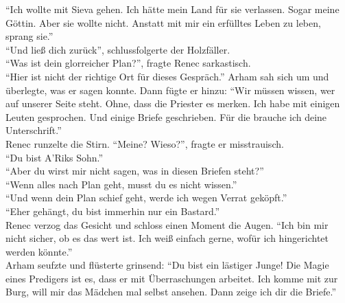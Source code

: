 ``Ich wollte mit Sieva gehen. Ich hätte mein Land für sie verlassen. Sogar meine Göttin. Aber sie 
wollte nicht. Anstatt mit mir ein erfülltes Leben zu leben, sprang sie.''\\
``Und ließ dich zurück'', schlussfolgerte der Holzfäller.\\
``Was ist dein glorreicher Plan?'', fragte Renec sarkastisch.\\
``Hier ist nicht der richtige Ort für dieses Gespräch.'' Arham sah sich um und überlegte, was er 
sagen konnte. Dann fügte er hinzu: ``Wir müssen wissen, wer auf unserer Seite steht. Ohne, dass 
die Priester es merken. Ich habe mit einigen Leuten gesprochen. Und einige Briefe geschrieben. Für 
die brauche ich deine Unterschrift.''\\
Renec runzelte die Stirn. ``Meine? Wieso?'', fragte er misstrauisch.\\
``Du bist A'Riks Sohn.''\\
``Aber du wirst mir nicht sagen, was in diesen Briefen steht?''\\
``Wenn alles nach Plan geht, musst du es nicht wissen.''\\
``Und wenn dein Plan schief geht, werde ich wegen Verrat geköpft.''\\
``Eher gehängt, du bist immerhin nur ein Bastard.''\\
Renec verzog das Gesicht und schloss einen Moment die Augen. ``Ich bin mir nicht sicher, ob es das 
wert ist. Ich weiß einfach gerne, wofür ich hingerichtet werden könnte.''\\
Arham seufzte und flüsterte grinsend: ``Du bist ein lästiger Junge! Die Magie eines Predigers ist 
es, dass er mit Überraschungen arbeitet. Ich komme mit zur Burg, will mir das Mädchen mal selbst 
ansehen. Dann zeige ich dir die Briefe.''\\


